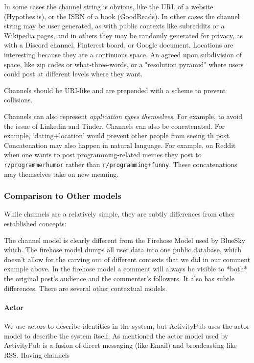 In some cases the channel string is obvious, like the URL of a website (Hypothes.is),
or the ISBN of a book (GoodReads).
In other cases the channel string may be user generated, as with
public contexts like subreddits or a Wikipedia pages,
and in others they may be randomly generated for privacy, as with
a Discord channel, Pinterest board, or Google document.
Locations are interesting because they are a continuous space.
An agreed upon subdivision of space, like zip codes or what-three-words,
or a "resolution pyramid" where users could post at different
levels where they want.

Channels should be URI-like and are prepended with a scheme to prevent
collisions.

Channels can also represent \emph{application types themselves}.
For example, to avoid the issue of Linkedin and Tinder.
Channels can also be concatenated.
For example, `dating+location' would prevent other people from seeing th post.
Concatenation may also happen in natural language.
For example, on Reddit when one wants to post programming-related memes they post to \texttt{r/programmerhumor} rather than \texttt{r/programming+funny}.
These concatenations may themselves take on new meaning.

\subsubsection{Comparison to Other models}

While channels are a relatively simple, they are subtly differences from other established concepts:

The channel model is clearly different from the Firehose Model used by BlueSky
which.
The firehose model dumps all user data into one public database,
which doesn't allow for the carving out of different contexts that we did in our comment
example above. In the firehose model a comment will always be visible to *both* the original post's audience and
the commenter's followers.
It also has subtle differences.
There are several other contextual models.

\paragraph{Actor}

We use actors to describe identities in the system,
but ActivityPub uses the actor model to describe the system itself.
As mentioned the actor model used by ActivityPub is a fusion of
direct messaging (like Email) and broadcasting like RSS.
Having channels

